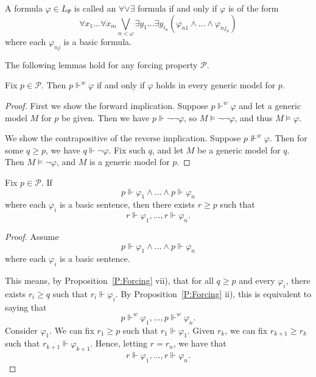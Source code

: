 \documentclass{scrartcl}
\renewcommand{\phi}{\varphi}
\newcommand{\SP}{\mathscr{P}}
\newcommand{\aore}{\forall \vee \exists}
\begin{document}
\begin{definition}
A formula $\phi\in L_\Psi$ is called an $\aore$ formula if and only if $\phi$ is of the form
\[
\forall x_1 \dots \forall x_m  \bigvee_{n< \omega} \exists y_1 \dots \exists y_{i_n} ( \phi_{n1}\wedge \dots \wedge \phi_{nj_n} ) 
\]
where each $\phi_{nj}$ is a basic formula.
\end{definition}


The following lemmas hold for any forcing property $\SP$.

\begin{lemma}
\label{L:weakly forces}
Fix $p\in \SP$. Then $p\Vdash ^w \phi $ if and only if $\phi$ holds in every generic model for $p$.
\end{lemma}

\begin{proof}
First we show the forward implication. Suppose $p\Vdash ^w \phi $ and let a generic model $M$ for $p$ be given. Then we have $p \Vdash \neg \neg \phi $, so $M\models \neg \neg \phi$, and thus $M\models \phi$.

We show the contrapositive of the reverse implication. Suppose $ p \not \Vdash ^w \phi $. Then for some $q\ge p$, we have $q\Vdash \neg \phi$. Fix such $q$, and let $M$ be a generic model for $q$. Then $M\models \neg \phi$, and $M$ is a generic model for $p$.
\end{proof}



\begin{lemma}
\label{L:force conjunction}

Fix $p\in \SP$. If
\[
p\Vdash \phi_1 \wedge \dots \wedge p\Vdash \phi_n
\]
where each $\phi_i$ is a basic sentence, then there exists $r\ge p$ such that
\[
r\Vdash \phi_1,\dots , r\Vdash \phi_n.
\]

\end{lemma}

\begin{proof}
Assume
\[
p\Vdash \phi_1 \wedge \dots \wedge p\Vdash \phi_n
\]
where each $\phi_i$ is a basic sentence.

This means, by Proposition~\ref{P:Forcing} vii), that for all $q\ge p $ and every $\phi_i$, there exists $r_i\ge q$ such that $r_i \Vdash \phi_i$. By Proposition~\ref{P:Forcing} ii), this is equivalent to saying that
\[
p\Vdash^w \phi_1,\dots , p\Vdash^w \phi_n.
\]
Consider $\phi_1$. We can fix $r_1 \geq p$ such that $r_1\Vdash \phi_1$. Given $r_k$, we can fix $r_{k+1} \geq r_k$ such that $r_{k+1}\Vdash \phi_{k+1}$. Hence, letting $r = r_n$, we have that
\[
r\Vdash \phi_1,\dots , r\Vdash \phi_n.
\]
\end{proof}
\end{document}
